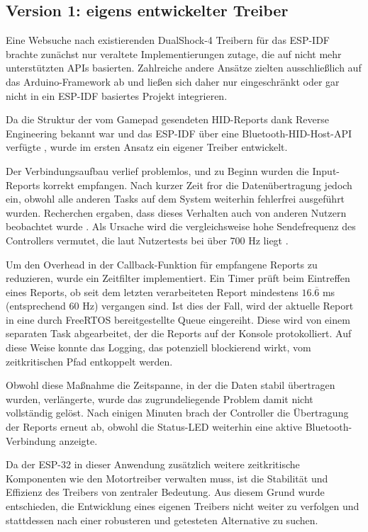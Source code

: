 \subsection{Version 1: eigens entwickelter Treiber}

Eine Websuche nach existierenden DualShock-4 Treibern für das ESP-IDF brachte zunächst nur veraltete Implementierungen zutage, die auf nicht mehr unterstützten APIs basierten. 
Zahlreiche andere Ansätze zielten ausschließlich auf das Arduino-Framework ab und ließen sich daher nur eingeschränkt oder gar nicht in ein ESP-IDF basiertes Projekt integrieren.

Da die Struktur der vom Gamepad gesendeten HID-Reports dank Reverse Engineering bekannt war und das ESP-IDF über eine Bluetooth-HID-Host-API verfügte \cite{esp_hib_bt_api}, wurde im ersten Ansatz ein eigener Treiber entwickelt.

Der Verbindungsaufbau verlief problemlos, und zu Beginn wurden die Input-Reports korrekt empfangen. 
Nach kurzer Zeit fror die Datenübertragung jedoch ein, obwohl alle anderen Tasks auf dem System weiterhin fehlerfrei ausgeführt wurden. 
Recherchen ergaben, dass dieses Verhalten auch von anderen Nutzern beobachtet wurde \cite{esp_hib_bt_api_issues}. 
Als Ursache wird die vergleichsweise hohe Sendefrequenz des Controllers vermutet, die laut Nutzertests bei über 700 Hz liegt \cite{esp_ds4_hid_reports}.

Um den Overhead in der Callback-Funktion für empfangene Reports zu reduzieren, wurde ein Zeitfilter implementiert. 
Ein Timer prüft beim Eintreffen eines Reports, ob seit dem letzten verarbeiteten Report mindestens $16.\overline{6}$ ms (entsprechend 60 Hz) vergangen sind. 
Ist dies der Fall, wird der aktuelle Report in eine durch FreeRTOS bereitgestellte Queue eingereiht. 
Diese wird von einem separaten Task abgearbeitet, der die Reports auf der Konsole protokolliert. 
Auf diese Weise konnte das Logging, das potenziell blockierend wirkt, vom zeitkritischen Pfad entkoppelt werden.

Obwohl diese Maßnahme die Zeitspanne, in der die Daten stabil übertragen wurden, verlängerte, wurde das zugrundeliegende Problem damit nicht vollständig gelöst. 
Nach einigen Minuten brach der Controller die Übertragung der Reports erneut ab, obwohl die Status-LED weiterhin eine aktive Bluetooth-Verbindung anzeigte.

Da der ESP-32 in dieser Anwendung zusätzlich weitere zeitkritische Komponenten wie den Motortreiber verwalten muss, ist die Stabilität und Effizienz des Treibers von zentraler Bedeutung.
Aus diesem Grund wurde entschieden, die Entwicklung eines eigenen Treibers nicht weiter zu verfolgen und stattdessen nach einer robusteren und getesteten Alternative zu suchen.

